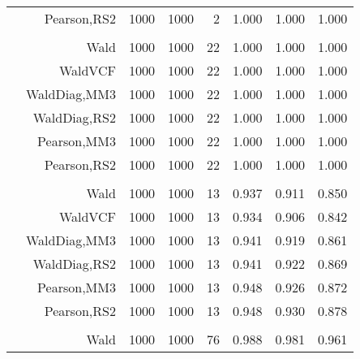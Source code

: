 \documentclass[
]{article}
\begin{document}
\begin{table}[H]
{\begin{tabular}[t]{lrrrrrrr}
\hspace{1em} & Pearson,RS2 & 1000 & 1000 & 2 & 1.000 & 1.000 & 1.000\\
\cmidrule{1-8}
\addlinespace[0.3em]
\multicolumn{8}{l}{\textbf{1F 15V}}\\
\hspace{1em} & Wald & 1000 & 1000 & 22 & 1.000 & 1.000 & 1.000\\

\hspace{1em} & WaldVCF & 1000 & 1000 & 22 & 1.000 & 1.000 & 1.000\\

\hspace{1em} & WaldDiag,MM3 & 1000 & 1000 & 22 & 1.000 & 1.000 & 1.000\\

\hspace{1em} & WaldDiag,RS2 & 1000 & 1000 & 22 & 1.000 & 1.000 & 1.000\\

\hspace{1em} & Pearson,MM3 & 1000 & 1000 & 22 & 1.000 & 1.000 & 1.000\\

\hspace{1em} & Pearson,RS2 & 1000 & 1000 & 22 & 1.000 & 1.000 & 1.000\\
\cmidrule{1-8}
\addlinespace[0.3em]
\multicolumn{8}{l}{\textbf{2F 10V}}\\
\hspace{1em} & Wald & 1000 & 1000 & 13 & 0.937 & 0.911 & 0.850\\

\hspace{1em} & WaldVCF & 1000 & 1000 & 13 & 0.934 & 0.906 & 0.842\\

\hspace{1em} & WaldDiag,MM3 & 1000 & 1000 & 13 & 0.941 & 0.919 & 0.861\\

\hspace{1em} & WaldDiag,RS2 & 1000 & 1000 & 13 & 0.941 & 0.922 & 0.869\\

\hspace{1em} & Pearson,MM3 & 1000 & 1000 & 13 & 0.948 & 0.926 & 0.872\\

\hspace{1em} & Pearson,RS2 & 1000 & 1000 & 13 & 0.948 & 0.930 & 0.878\\
\cmidrule{1-8}
\addlinespace[0.3em]
\multicolumn{8}{l}{\textbf{3F 15V}}\\
\hspace{1em} & Wald & 1000 & 1000 & 76 & 0.988 & 0.981 & 0.961\\


\end{tabular}}
\end{table}
\end{document}
